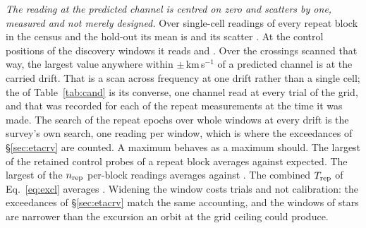 \begin{table}
\centering
\caption{\textbf{What an injected carrier at the trigger amplitude is
recovered at}, for each of the \HjNMeas{} crossings that carry an exclusion,
ordered by what is measured. Every realisation was deposited in the retained
per-integration spectra of the real data -- the discovery block and the
$n_{\rm rep}$ covering repeat blocks, \GpNRoleInj{} windows in all -- and none
used synthetic noise. $\nu_\star$ is the crossing's frequency in the
star's own rest frame, $\Phi$ the chance the expression above gives, and
beside it the fraction of $N$ realisations of the frozen reading that
recovered the carrier, with its binomial interval. The leading
\HjNPowerLo{} rows are the crossings reported untested rather than excluded.}
\label{tab:hostinj}
\scriptsize

\end{table}

\emph{The reading at the predicted channel is centred on zero and scatters
by one, measured and not merely designed.} Over \NuNullN{} single-cell
readings of every repeat block in the census and the hold-out its mean is
\NuNullMean{} and its scatter \NuNullSd. At the control positions of the
discovery windows it reads \NuDiscCtrlMean{} and \NuDiscCtrlSd. Over the
\WdBandNCross{} crossings scanned that way, the
largest value anywhere within $\pm$\WdBandKms\,km\,s$^{-1}$ of a predicted
channel is \WdBandMax{} at the carried drift. That is a scan across frequency
at one drift rather than a single cell; the
\RcTMax{} of Table~\ref{tab:cand} is its converse, one channel read at every
trial of the grid, and that was recorded for each of the \RcNRepeatMeas{}
repeat measurements at the time it was made. The search of the repeat epochs
over whole windows at every drift is the survey's own search, one reading per
window, which is where the \WdNExc{} exceedances of
\S\ref{sec:etacrv} are counted. A maximum behaves as a maximum should. The
largest of the
\NuCtrlRet{} retained control probes of a repeat block averages
\NuCtrlMean{} against \NuCtrlPred{} expected. The largest of the
$n_{\rm rep}$ per-block readings averages \NuColMean{} against \NuColPred. The
combined $T_{\rm rep}$ of Eq.~\ref{eq:excl} averages \NuRepMean. Widening
the window
costs trials and not calibration: the exceedances of \S\ref{sec:etacrv}
match the same accounting, and the windows of \EcNShortStar{} stars are
narrower than the excursion an orbit at the grid ceiling could produce.

